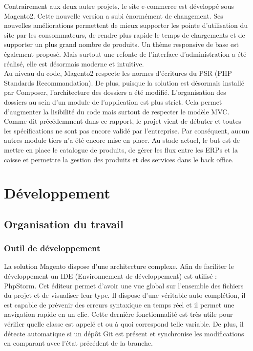 \documentclass[12pt, a4paper, twoside]{report}
\begin{document}
Contrairement aux deux autre projets, le site e-commerce est développé sous Magento2. Cette nouvelle version a subi énormément de changement. Ses nouvelles améliorations permettent de mieux supporter les pointe d'utilisation du site par les consommateurs, de rendre plus rapide le temps de chargements et de supporter un plus grand nombre de produits. Un thème responsive de base est également proposé. Mais surtout une refonte de l'interface d'administration a été réalisé, elle est désormais moderne et intuitive. \\ 

Au niveau du code, Magento2 respecte les normes d'écritures du PSR (PHP Standards Recommandation). De plus, puisque la solution est désormais installé par Composer, l'architecture des dossiers a été modifié. L'organisation des dossiers au sein d'un module de l'application est plus strict. Cela permet d'augmenter la lisibilité du code mais surtout de respecter le modèle MVC. \\

Comme dit précédemment dans ce rapport, le projet vient de débuter et toutes les spécifications ne sont pas encore validé par l'entreprise. Par conséquent, aucun autres module tiers n'a été encore mise en place. Au stade actuel, le but est de mettre en place le catalogue de produits, de gérer les flux entre les ERPs et la caisse et permettre la gestion des produits et des services dans le back office.

\chapter{Développement}

\section{Organisation du travail}

\subsection{Outil de développement}

La solution Magento dispose d'une architecture complexe. Afin de faciliter le développement un IDE (Environnement de développement) est utilisé : PhpStorm. Cet éditeur permet d'avoir une vue global sur l'ensemble des fichiers du projet et de visualiser leur type. Il dispose d'une véritable auto-complétion, il est capable de prévenir des erreurs syntaxique en temps réel et il permet une navigation rapide en un clic. Cette dernière fonctionnalité est très utile pour vérifier quelle classe est appelé et ou à quoi correspond telle variable. De plus, il détecte automatique si un dépôt Git est présent et synchronise les modifications en comparant avec l'état précédent de la branche. \\
\end{document}

